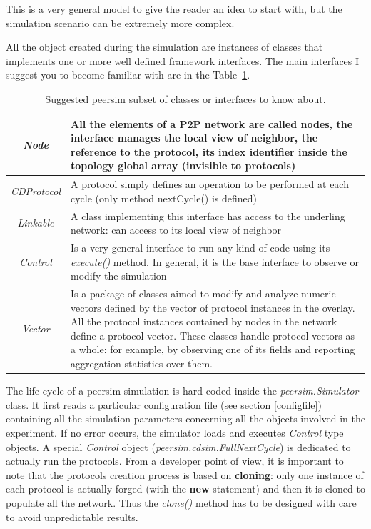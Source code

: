 \documentclass[a4paper,11pt]{article}
\begin{document}
This is a very general model to give the reader an idea to start with,
but the simulation scenario can be extremely more complex. 

All the object created during the simulation are instances of classes
that implements one or more well defined framework interfaces. The
main interfaces I suggest you to become familiar with are in the
Table~\ref{t:psim_classes}.


\label{table1}
\begin{table}
\begin{center}\begin{tabular}{|c|p{2.5in}|}
\hline 
\emph{Node}&
All the elements of a P2P network are called nodes, the interface
manages the local view of neighbor, the reference to the protocol,
its index identifier inside the topology global array (invisible to
protocols)\\
\hline 
\emph{CDProtocol}&
A protocol simply defines an operation to be performed at each cycle
(only method nextCycle() is defined)\\
\hline 
\emph{Linkable}&
A class implementing this interface has access to the underling network:
can access to its local view of neighbor\\
\hline 
\emph{Control}&
Is a very general interface to run any kind of code using its
\emph{execute()} method. In general, it is the base interface to observe or
modify the simulation\\
\hline
\emph{Vector}&
Is a package of classes aimed to modify and analyze numeric vectors
defined by the vector of protocol instances in the overlay. All the
protocol instances contained by nodes in the network define a protocol
vector. These classes handle protocol vectors as a whole: for example,
by observing one of its fields and reporting aggregation statistics
over them. \\
\hline
\end{tabular}\end{center}

\caption{\label{t:psim_classes}Suggested peersim subset of classes or
  interfaces to know about.} 
\end{table}


The life-cycle of a peersim simulation is hard coded inside the
\emph{peersim.Simulator} class. It first reads a particular
configuration file (see section 
\ref{configfile}) containing all the simulation parameters 
concerning all the
objects involved in the experiment. If no error occurs, the simulator
loads and executes \emph{Control} type objects. A special
\emph{Control} object (\emph{peersim.cdsim.FullNextCycle}) is
dedicated to actually run the protocols.
From a developer point of view, it is important to note that the
protocols creation process is based on \textbf{cloning}: only one instance
of each protocol is actually forged (with the \textbf{new} statement)
and then it is cloned to populate all the network. Thus the 
\emph{clone()} method has to be designed with care to avoid 
unpredictable results.
\end{document}
